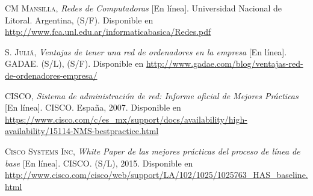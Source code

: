 
\begin{thebibliography}{X}

		\textsc{CM Mansilla,}
		\textit{Redes de Computadoras} [En línea].
		Universidad Nacional de Litoral. Argentina, (S/F). 
		\newline
		Disponible en 
		\url{http://www.fca.unl.edu.ar/informaticabasica/Redes.pdf}

		\textsc{S. Juliá,}
		\textit{Ventajas de tener una red de ordenadores en la empresa} [En línea].
		GADAE. (S/L), (S/F). 
		\newline
		Disponible en 
		\url{http://www.gadae.com/blog/ventajas-red-de-ordenadores-empresa/}

		\textsc{CISCO,}
		\textit{Sistema de administración de red: Informe oficial de Mejores Prácticas} [En línea].
		CISCO. España, 2007. 
		\newline
		Disponible en 
		\url{https://www.cisco.com/c/es_mx/support/docs/availability/high-availability/15114-NMS-bestpractice.html}

		\textsc{Cisco Systems Inc,}
		\textit{White Paper de las mejores prácticas del proceso de línea de base} [En línea].
		CISCO. (S/L), 2015. 
		\newline
		Disponible en 
		\url{http://www.cisco.com/cisco/web/support/LA/102/1025/1025763_HAS_baseline.html}
		

\end{thebibliography}

